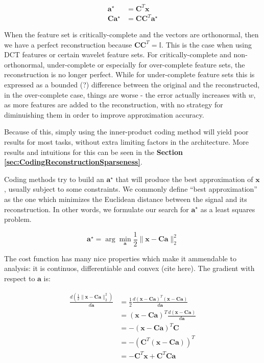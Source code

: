 \documentclass[12pt,a4paper,oneside,english]{UPBThesis}
\begin{document}
\begin{align*}
\textbf{a}^\star & = \textbf{C}^T\textbf{x} \\
\textbf{C}\textbf{a}^\star & = \textbf{C}\textbf{C}^T\textbf{a}^\star
\end{align*}

When the feature set is critically-complete and the vectors are orthonormal, then we have a perfect reconstruction because $\textbf{C}\textbf{C}^T = \mathbb{I}$. This is the case when using DCT features or certain wavelet feature sets. For critically-complete and non-orthonormal, under-complete or especially for over-complete feature sets, the reconstruction is no longer perfect. While for under-complete feature sets this is expressed as a bounded (?) difference between the original and the reconstructed, in the over-complete case, things are worse - the error actually increases with $w$, as more features are added to the reconstruction, with no strategy for diminuishing them in order to improve approximation accuracy.

Because of this, simply using the inner-product coding method will yield poor results for most tasks, without extra limiting factors in the architecture. More results and intuitions for this can be seen in the \textbf{Section \ref{sec:CodingReconstructionSparseness}}.

Coding methods try to build an $\textbf{a}^\star$ that will produce the best approximation of $\textbf{x}$, usually subject to some constraints. We commonly define ``best approximation'' as the one which minimizes the Euclidean distance between the signal and its reconstruction. In other words, we formulate our search for $\textbf{a}^\star$ as a least squares problem.

\begin{equation}
\textbf{a}^{\star} = \arg\min_{\textbf{a}} \frac{1}{2} \| \textbf{x} - \textbf{C}\textbf{a} \|_2^2
\end{equation}

The cost function has many nice properties which make it ammendable to analysis: it is continuos, differentiable and convex (cite here). The gradient with respect to $\textbf{a}$ is:

\begin{align*}
\frac{d \left( \frac{1}{2}\|\textbf{x} - \textbf{C}\textbf{a}\|_2^2 \right)}{d\textbf{a}} & = \frac{1}{2} \frac{d {\left( \textbf{x} - \textbf{C}\textbf{a} \right)}^T\left( \textbf{x} - \textbf{C}\textbf{a} \right)}{d\textbf{a}} \\
& = {\left( \textbf{x} - \textbf{C}\textbf{a} \right)}^T \frac{d \left( \textbf{x} - \textbf{C}\textbf{a} \right)}{d\textbf{a}} \\
& = - {\left( \textbf{x} - \textbf{C}\textbf{a} \right)}^T \textbf{C} \\
& = - {\left( \textbf{C}^T \left( \textbf{x} - \textbf{C}\textbf{a} \right) \right)}^T \\
& = - \textbf{C}^T \textbf{x} + \textbf{C}^T\textbf{C}\textbf{a}
\end{align*}
\end{document}
